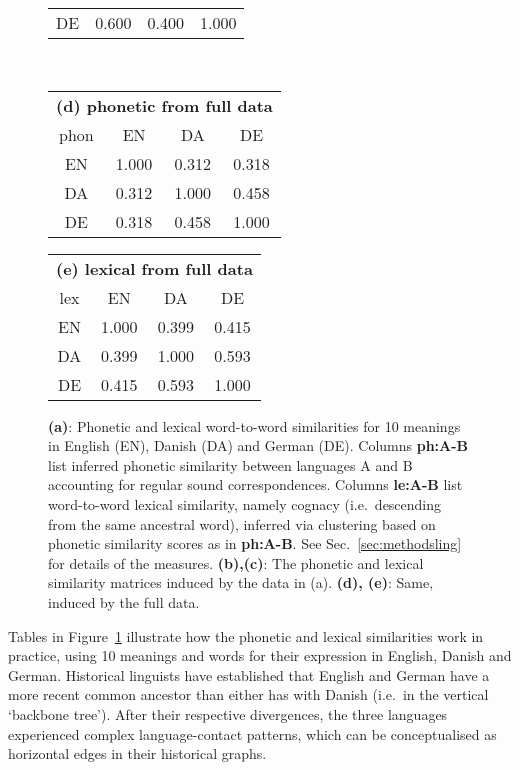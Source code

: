 \documentclass[a4]{article}
\newcommand{\+}[1]{\mathbf{#1}}
\begin{document}
\begin{figure}[!ht]
\begin{center}
\begin{tabular}{c|ccc}
DE &	0.600	& 0.400	& 1.000 \\
\end{tabular}
\\[0.2in]
\begin{tabular}{c|ccc}
\multicolumn{4}{c}{\bf (d) phonetic from full data}\\[4pt]
phon & EN & DA & DE \\\hline
EN	& 1.000	& 0.312	& 0.318 \\
DA	& 0.312	& 1.000	& 0.458 \\
DE	& 0.318	& 0.458	& 1.000 \\
\end{tabular}
\hspace{0.4in} 
\begin{tabular}{c|ccc}
\multicolumn{4}{c}{\bf (e) lexical from full data}\\[4pt]
lex & EN & DA & DE \\\hline
EN	& 1.000	& 0.399	& 0.415 \\
DA	& 0.399	& 1.000	& 0.593 \\
DE	& 0.415	& 0.593	& 1.000 \\
\end{tabular}
\caption{{\bf (a)}: Phonetic and lexical word-to-word similarities for 10 meanings in English (EN), Danish (DA) and German (DE). Columns \textbf{ph:A-B} list inferred phonetic similarity between languages A and B accounting for regular sound correspondences. Columns \textbf{le:A-B} list word-to-word lexical similarity, namely cognacy (i.e.~descending from the same ancestral word), inferred via clustering based on phonetic similarity scores as in \textbf{ph:A-B}. See Sec.~\ref{sec:methodsling} for details of the measures. {\bf (b),(c)}: The phonetic and lexical similarity matrices induced by the data in (a). {\bf (d), (e)}: Same, induced by the full data.}
\label{fig:ling-ex-tables}
\end{center}
\end{figure}

Tables in Figure~\ref{fig:ling-ex-tables}  illustrate how the phonetic and lexical similarities work in practice, using 10 meanings and words for their expression in English, Danish and German. Historical linguists have established that English and German have a more recent common ancestor than either has with Danish (i.e.~in the vertical `backbone tree'). After their respective divergences, the three languages experienced complex language-contact patterns, which can be conceptualised as horizontal edges in their historical graphs.
\end{document}
